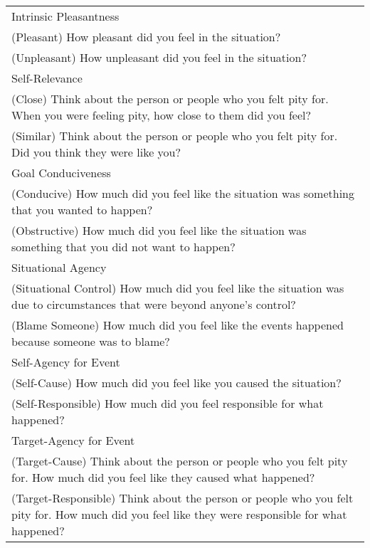 \documentclass[man]{apa6}
\begin{document}
\begin{table}
\tiny
\begin{tabular}{p{16cm}}
Intrinsic Pleasantness \\
\hspace{1cm}(Pleasant) How pleasant did you feel in the situation? \\
\hspace{1cm}(Unpleasant) How unpleasant did you feel in the situation? \\
Self-Relevance \\
\hspace{1cm}(Close) Think about the person or people who you felt pity for. When you were feeling pity, how close to them did you feel? \\
\hspace{1cm}(Similar) Think about the person or people who you felt pity for. Did you think they were like you? \\
Goal Conduciveness \\
\hspace{1cm}(Conducive) How much did you feel like the situation was something that you wanted to happen? \\
\hspace{1cm}(Obstructive) How much did you feel like the situation was something that you did not want to happen? \\
Situational Agency \\
\hspace{1cm}(Situational Control) How much did you feel like the situation was due to circumstances that were beyond anyone’s control? \\
\hspace{1cm}(Blame Someone) How much did you feel like the events happened because someone was to blame? \\
Self-Agency for Event \\
\hspace{1cm}(Self-Cause) How much did you feel like you caused the situation? \\
\hspace{1cm}(Self-Responsible) How much did you feel responsible for what happened? \\
Target-Agency for Event \\
\hspace{1cm}(Target-Cause) Think about the person or people who you felt pity for. How much did you feel like they caused what happened? \\
\hspace{1cm}(Target-Responsible) Think about the person or people who you felt pity for. How much did you feel like they were responsible for what happened? \\

\end{tabular}
\end{table}
\end{document}
